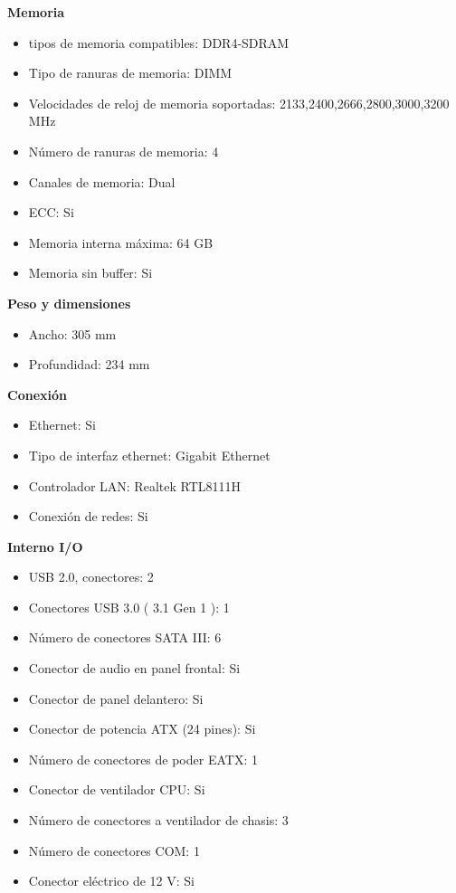 \documentclass{article}
\begin{document}
    \textbf{Memoria}
    \begin{itemize}
      \item tipos de memoria compatibles: DDR4-SDRAM
      \item Tipo de ranuras de memoria: DIMM
      \item Velocidades de reloj de memoria soportadas: 2133,2400,2666,2800,3000,3200 MHz
      \item Número de ranuras de memoria: 4
      \item Canales de memoria: Dual
      \item ECC: Si
      \item Memoria interna máxima: 64 GB
      \item Memoria sin buffer: Si
    \end{itemize}
        
    \textbf{Peso y dimensiones}
    \begin{itemize}
      \item Ancho: 305 mm
      \item Profundidad: 234 mm
    \end{itemize}
        
    \textbf{Conexión}
    \begin{itemize}
      \item Ethernet: Si
      \item Tipo de interfaz ethernet: Gigabit Ethernet
      \item Controlador LAN: Realtek RTL8111H
      \item Conexión de redes: Si
    \end{itemize}
        

    \textbf{Interno I/O}
    \begin{itemize}
      \item USB 2.0, conectores: 2
      \item Conectores USB 3.0 ( 3.1 Gen 1 ): 1
      \item Número de conectores SATA III: 6
      \item Conector de audio en panel frontal: Si
      \item Conector de panel delantero: Si
      \item Conector de potencia ATX (24 pines): Si
      \item Número de conectores de poder EATX: 1
      \item Conector de ventilador CPU: Si
      \item Número de conectores a ventilador de chasis: 3
      \item Número de conectores COM: 1
      \item Conector eléctrico de 12 V: Si
    \end{itemize}
\end{document}
